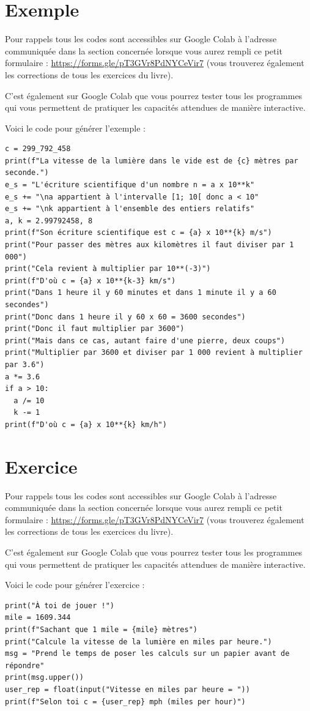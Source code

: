 \documentclass[a4paper, 11pt, twoside]{book}
\begin{document}
\section{Exemple}
\label{sec:orga5b1cb5}
Pour rappels tous les codes sont accessibles sur Google Colab à
l'adresse communiquée dans la section concernée lorsque vous
aurez rempli ce petit formulaire :
\url{https://forms.gle/pT3GVr8PdNYCeVir7} (vous trouverez également
les corrections de tous les exercices du livre).

C'est également sur Google Colab que vous pourrez tester tous les
programmes qui vous permettent de pratiquer les capacités attendues
de manière interactive.

Voici le code pour générer l'exemple :
\begin{verbatim}
c = 299_792_458
print(f"La vitesse de la lumière dans le vide est de {c} mètres par seconde.")
e_s = "L'écriture scientifique d'un nombre n = a x 10**k"
e_s += "\na appartient à l'intervalle [1; 10[ donc a < 10"
e_s += "\nk appartient à l'ensemble des entiers relatifs"
a, k = 2.99792458, 8
print(f"Son écriture scientifique est c = {a} x 10**{k} m/s")
print("Pour passer des mètres aux kilomètres il faut diviser par 1 000")
print("Cela revient à multiplier par 10**(-3)")
print(f"D'où c = {a} x 10**{k-3} km/s")
print("Dans 1 heure il y 60 minutes et dans 1 minute il y a 60 secondes")
print("Donc dans 1 heure il y 60 x 60 = 3600 secondes")
print("Donc il faut multiplier par 3600")
print("Mais dans ce cas, autant faire d'une pierre, deux coups")
print("Multiplier par 3600 et diviser par 1 000 revient à multiplier par 3.6")
a *= 3.6
if a > 10:
  a /= 10
  k -= 1
print(f"D'où c = {a} x 10**{k} km/h")
\end{verbatim}

\section{Exercice}
\label{sec:org329206f}
Pour rappels tous les codes sont accessibles sur Google Colab à
l'adresse communiquée dans la section concernée lorsque vous
aurez rempli ce petit formulaire :
\url{https://forms.gle/pT3GVr8PdNYCeVir7} (vous trouverez également
les corrections de tous les exercices du livre).

C'est également sur Google Colab que vous pourrez tester tous les
programmes qui vous permettent de pratiquer les capacités attendues
de manière interactive.

Voici le code pour générer l'exercice :
\begin{verbatim}
print("À toi de jouer !")
mile = 1609.344
print(f"Sachant que 1 mile = {mile} mètres")
print("Calcule la vitesse de la lumière en miles par heure.")
msg = "Prend le temps de poser les calculs sur un papier avant de répondre"
print(msg.upper())
user_rep = float(input("Vitesse en miles par heure = "))
print(f"Selon toi c = {user_rep} mph (miles per hour)")
\end{verbatim}
\stopcontents[level-2]
\stopcontents[level-1]
\end{document}
